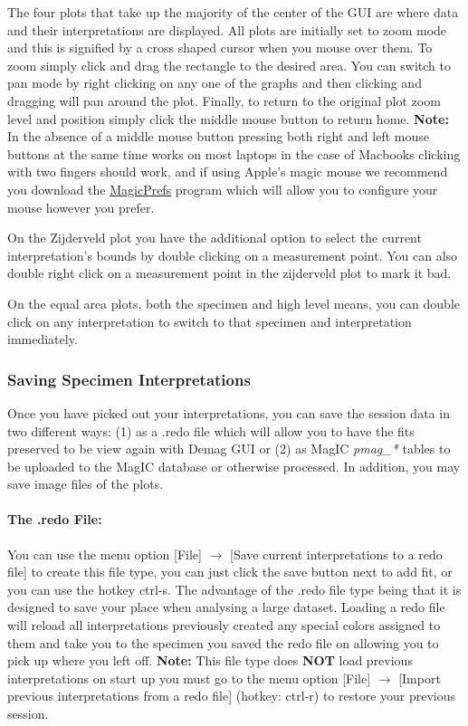 \documentclass[11pt]{book}
\begin{document}
{The four plots that take up the majority of the center of the GUI are where data and their interpretations are displayed. All plots are initially set to zoom mode and this is signified by a cross shaped cursor when you mouse over them. To zoom simply click and drag the rectangle to the desired area. You can switch to pan mode by right clicking on any one of the graphs and then clicking and dragging will pan around the plot. Finally, to return to the original plot zoom level and position simply click the middle mouse button to return home. \textbf{Note:} In the absence of a middle mouse button pressing both right and left mouse buttons at the same time works on most laptops in the case of Macbooks clicking with two fingers should work, and if using Apple's magic mouse we recommend you download the \href{http://magicprefs.com/}{MagicPrefs} program which will allow you to configure your mouse however you prefer.

\noindent On the Zijderveld plot you have the additional option to select the current interpretation's bounds by double clicking on a measurement point. You can also double right click on a measurement point in the zijderveld plot to mark it bad.

\noindent On the equal area plots, both the specimen and high level means, you can double click on any interpretation to switch to that specimen and interpretation immediately.

\subsubsection{Saving Specimen Interpretations}\label{saving-specimen-interpretations}

Once you have picked out your interpretations, you can save the session data in two different ways: (1) as a .redo file which will allow you to have the fits preserved to be view again with Demag GUI or (2) as MagIC {\it pmag\_*} tables to be uploaded to the MagIC database or otherwise processed. In addition, you may save image files of the plots.

\paragraph{The .redo File:}\label{the-.redo-file} You can use the menu option [File] $\rightarrow$ [Save current interpretations to a redo file] to create this file type, you can just click the save button next to add fit, or you can use the hotkey ctrl-s. The advantage of the .redo file type being that it is designed to save your place when analysing a large dataset. Loading a redo file will reload all interpretations previously created any special colors assigned to them and take you to the specimen you saved the redo file on allowing you to pick up where you left off. \textbf{Note:} This file type does \textbf{NOT} load previous interpretations on start up you must go to the menu option [File] $\rightarrow$ [Import previous interpretations from a redo file] (hotkey: ctrl-r) to restore your previous session.

}
\end{document}
